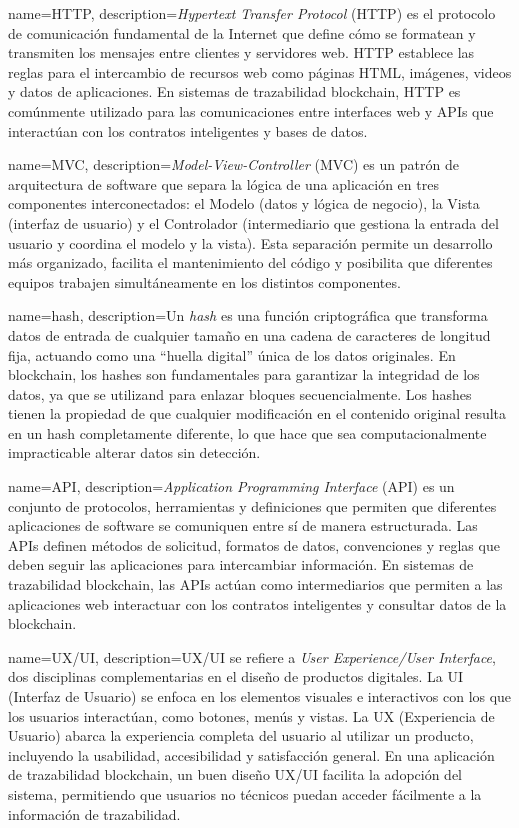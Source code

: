 {
    name=HTTP,
    description={\textit{Hypertext Transfer Protocol} (HTTP) es el protocolo de comunicación fundamental de la Internet que define cómo se formatean y transmiten los mensajes entre clientes y servidores web. HTTP establece las reglas para el intercambio de recursos web como páginas HTML, imágenes, videos y datos de aplicaciones. En sistemas de trazabilidad blockchain, HTTP es comúnmente utilizado para las comunicaciones entre interfaces web y APIs que interactúan con los contratos inteligentes y bases de datos.}
}

{
    name=MVC,
    description={\textit{Model-View-Controller} (MVC) es un patrón de arquitectura de software que separa la lógica de una aplicación en tres componentes interconectados: el Modelo (datos y lógica de negocio), la Vista (interfaz de usuario) y el Controlador (intermediario que gestiona la entrada del usuario y coordina el modelo y la vista). Esta separación permite un desarrollo más organizado, facilita el mantenimiento del código y posibilita que diferentes equipos trabajen simultáneamente en los distintos componentes.}
}

{
    name=hash,
    description={Un \textit{hash} es una función criptográfica que transforma datos de entrada de cualquier tamaño en una cadena de caracteres de longitud fija, actuando como una ``huella digital'' única de los datos originales. En blockchain, los hashes son fundamentales para garantizar la integridad de los datos, ya que se utilizand para enlazar bloques secuencialmente. Los hashes tienen la propiedad de que cualquier modificación en el contenido original resulta en un hash completamente diferente, lo que hace que sea computacionalmente impracticable alterar datos sin detección.}
}

{
    name=API,
    description={\textit{Application Programming Interface} (API) es un conjunto de protocolos, herramientas y definiciones que permiten que diferentes aplicaciones de software se comuniquen entre sí de manera estructurada. Las APIs definen métodos de solicitud, formatos de datos, convenciones y reglas que deben seguir las aplicaciones para intercambiar información. En sistemas de trazabilidad blockchain, las APIs actúan como intermediarios que permiten a las aplicaciones web interactuar con los contratos inteligentes y consultar datos de la blockchain.}
}   

{
    name=UX/UI,
    description={UX/UI se refiere a \textit{User Experience/User Interface}, dos disciplinas complementarias en el diseño de productos digitales. La UI (Interfaz de Usuario) se enfoca en los elementos visuales e interactivos con los que los usuarios interactúan, como botones, menús y vistas. La UX (Experiencia de Usuario) abarca la experiencia completa del usuario al utilizar un producto, incluyendo la usabilidad, accesibilidad y satisfacción general. En una aplicación de trazabilidad blockchain, un buen diseño UX/UI facilita la adopción del sistema, permitiendo que usuarios no técnicos puedan acceder fácilmente a la información de trazabilidad.}
}

